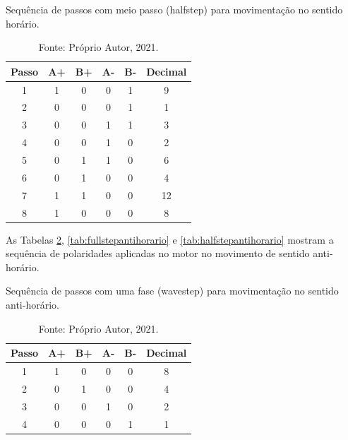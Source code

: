 \begin{table}[H]
    \centering
    \caption{Sequência de passos com meio passo (halfstep) para movimentação no sentido horário.}
    \begin{tabular}{cccccc}
        \hline
        \textbf{Passo} & \textbf{A+} & \textbf{B+} & \textbf{A-} & \textbf{B-} & \textbf{Decimal}\\
        \hline
        1 & 1 & 0 & 0 & 1 & 9\\
        2 & 0 & 0 & 0 & 1 & 1\\
        3 & 0 & 0 & 1 & 1 & 3\\
        4 & 0 & 0 & 1 & 0 & 2\\
        5 & 0 & 1 & 1 & 0 & 6\\
        6 & 0 & 1 & 0 & 0 & 4\\
        7 & 1 & 1 & 0 & 0 & 12\\
        8 & 1 & 0 & 0 & 0 & 8\\
        \hline       
    \end{tabular}
    \caption*{Fonte: Próprio Autor, 2021.}
    \label{tab:halfstephorario}
\end{table}

As Tabelas \ref{tab:wavestepantihorario}, \ref{tab:fullstepantihorario} e \ref{tab:halfstepantihorario} 
mostram a sequência de polaridades aplicadas no motor no movimento de sentido anti-horário.

\begin{table}[H]
    \centering
    \caption{Sequência de passos com uma fase (wavestep) para movimentação no sentido anti-horário.}
    \begin{tabular}{cccccc}
        \hline
        \textbf{Passo} & \textbf{A+} & \textbf{B+} & \textbf{A-} & \textbf{B-} & \textbf{Decimal}\\
        \hline
        1 & 1 & 0 & 0 & 0 & 8\\
        2 & 0 & 1 & 0 & 0 & 4\\
        3 & 0 & 0 & 1 & 0 & 2\\
        4 & 0 & 0 & 0 & 1 & 1\\
        \hline       
    \end{tabular}
    \caption*{Fonte: Próprio Autor, 2021.}
    \label{tab:wavestepantihorario}
\end{table}

